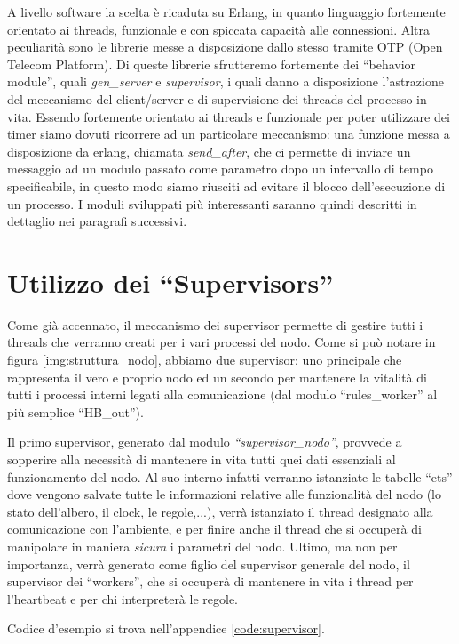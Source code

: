 \documentclass[italian]{memoir}
\begin{document}
A livello software la scelta è ricaduta su Erlang, in quanto linguaggio fortemente orientato ai threads, funzionale e con spiccata capacità alle connessioni. Altra peculiarità sono le librerie messe a disposizione dallo stesso tramite OTP (Open Telecom Platform). Di queste librerie sfrutteremo fortemente dei ``behavior module'', quali \textit{gen\_server} e \textit{supervisor}, i quali danno a disposizione l'astrazione del meccanismo del client/server e di supervisione dei threads del processo in vita. Essendo fortemente orientato ai threads e funzionale per poter utilizzare dei timer siamo dovuti ricorrere ad un particolare meccanismo: una funzione messa a disposizione da erlang, chiamata \textit{send\_after}, che ci permette di inviare un messaggio ad un modulo passato come parametro dopo un intervallo di tempo specificabile, in questo modo siamo riusciti ad evitare il blocco dell'esecuzione di un processo. I moduli sviluppati più interessanti saranno quindi descritti in dettaglio nei paragrafi successivi.

\section{Utilizzo dei ``Supervisors''}
Come già accennato, il meccanismo dei supervisor permette di gestire tutti i threads che verranno creati per i vari processi del nodo. Come si può notare in figura \ref{img:struttura_nodo}, abbiamo due supervisor: uno principale che rappresenta il vero e proprio nodo ed un secondo per mantenere la vitalità di tutti i processi interni legati alla comunicazione (dal modulo ``rules\_worker'' al più semplice ``HB\_out'').

Il primo supervisor, generato dal modulo \textit{``supervisor\_nodo''}, provvede a sopperire alla necessità di mantenere in vita tutti quei dati essenziali al funzionamento del nodo. Al suo interno infatti verranno istanziate le tabelle ``ets'' dove vengono salvate tutte le informazioni relative alle funzionalità del nodo (lo stato dell'albero, il clock, le regole,...), verrà istanziato il thread designato alla comunicazione con l'ambiente, e per finire anche il thread che si occuperà di manipolare in maniera \textit{sicura} i parametri del nodo. Ultimo, ma non per importanza, verrà generato come figlio del supervisor generale del nodo, il supervisor dei ``workers'', che si occuperà di mantenere in vita i thread per l'heartbeat e per chi interpreterà le regole.

Codice d'esempio si trova nell'appendice \ref{code:supervisor}.
\end{document}
